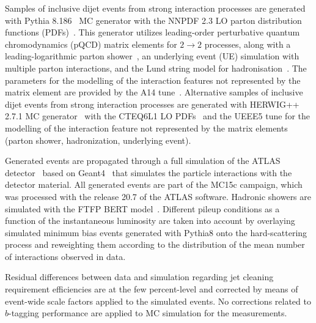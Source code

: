 Samples of inclusive dijet events from strong interaction processes are generated with Pythia 8.186~\cite{pythia} MC generator with the NNPDF 2.3 LO parton distribution functions (PDFs)~\cite{nnpdflo}. This generator utilizes leading-order perturbative quantum chromodynamics (pQCD) matrix elements for $2\rightarrow 2$ processes, along with a leading-logarithmic parton shower~\cite{pythia_ps}, an underlying event (UE) simulation with multiple parton interactions, and the Lund string model for hadronisation~\cite{pythia_hadron}. The parameters for the modelling of the interaction features not represented by the matrix element are provided by the A14 tune~\cite{a14_tune}. Alternative samples of inclusive dijet events from strong interaction processes are generated with HERWIG++ 2.7.1 MC generator~\cite{herwig_pp} with the CTEQ6L1 LO PDFs~\cite{cteqlo} and the UEEE5 tune for the modelling of the interaction feature not represented by the matrix elements (parton shower, hadronization, underlying event).

Generated events are propagated through a full simulation of the ATLAS detector~\cite{SOFT-2010-01} based on Geant4~\cite{geant4} that simulates the particle interactions with the detector material. All generated events are part of the MC15c campaign, which was processed with the release 20.7 of the ATLAS software. Hadronic showers are simulated with the FTFP BERT model~\cite{string_geant4}. Different pileup conditions as a function of the instantaneous luminosity are taken into account by overlaying simulated minimum bias events generated with Pythia8 onto the hard-scattering process and reweighting them according to the distribution of the mean number of interactions observed in data. 

Residual differences between data and simulation regarding jet cleaning requirement efficiencies are at the few percent-level and corrected by means of event-wide scale factors applied to the simulated events. No corrections related to $b$-tagging performance are applied to MC simulation for the measurements.

